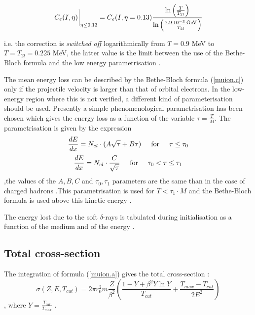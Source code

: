 \[
\left . C_{e}(I,\eta) \rule{0mm}{5mm} \right |_{\eta \leq
0.13} = C_{e}(I,\eta=0.13)\frac{\ln \left ( \frac{T}{T_{2l}} \right )}
{\ln \left ( \frac{7.9 \: 10^{-3} \: \rm GeV}{T_{2l}} \right )}
\]

i.e. the correction is {\it switched off} logarithmically from $T=0.9$
MeV to $T=T_{2l}=0.225$ MeV, the latter value is the limit between the use 
 of the Bethe-Bloch formula and the low energy parametrisation .

The mean energy loss can be described by the Bethe-Bloch formula
(\ref{muion.c}) only if the projectile velocity is larger than that
of orbital electrons. In the low-energy region where this is not
verified, a different kind of parameterisation should be used. 
Presently a simple phenomenological parametrisation has been chosen which 
 gives the energy loss as a function of the variable
 $\tau = \frac{T}{M}$.
The parametrisation is given by the expression
\begin{equation}
\label{muion.f}
\frac{dE}{dx}  =  N_{el} \cdot (A\sqrt{\tau}+B \tau )  
       \mbox{\hspace{0.5cm}for\hspace{0.5cm}}
        \tau \leq \tau _{0} 
\end{equation}
\begin{equation}
\label{muion.g}
\frac{dE}{dx}  =  N_{el} \cdot \frac{C}{\sqrt{\tau }} 
              \mbox{\hspace{0.5cm}for\hspace{0.5cm}} 
        \tau _{0} < \tau \leq \tau _{1} 
\end{equation}
 ,the values of the $A,B,C$ and $\tau _{0} ,\tau _{1}$ parameters are
the same than in the case of charged hadrons .This parametrisation is
used for $T < \tau_1 \cdot M$ and                     
  the Bethe-Bloch formula is used above this kinetic energy .       

The energy lost due to the soft $\delta$-rays is tabulated during
initialisation as a function of the medium and of the energy .

\subsection{Total cross-section}
The integration of formula (\ref{muion.a}) gives the total cross-section :
\begin{equation}
\label{muion.h}
\sigma (Z,E,T_{cut}) = 
2 \pi r^2_0 m  \frac{Z}{\beta^2} \left (\frac{1-Y+\beta^2 Y\ln Y}{T_{cut}}
+ \frac{T_{max}-T_{cut}} {2E^2} \right) 
\end{equation}
 , where  $Y = \frac{T_{cut}}{T_{max}} $ .

